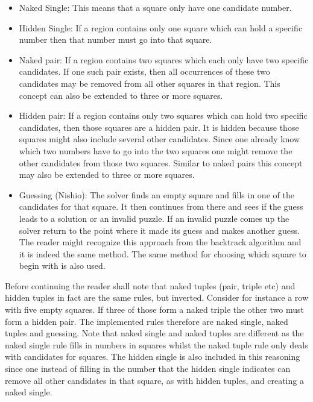 \documentclass[a4paper,11pt]{kth-mag}
\begin{document}
\begin{itemize}
    \item Naked Single: 
    This means that a square only have one candidate number.
    \item Hidden Single: 
    If a region contains only one square which can hold a specific number then that number must go into that square.
    \item Naked pair:
    If a region contains two squares which each only have two specific candidates.
If one such pair exists, then all occurrences of these two candidates may be removed from all other squares in that region.
This concept can also be extended to three or more squares.
    \item Hidden pair:
    If a region contains only two squares which can hold two specific candidates, then those squares are a hidden pair.
It is hidden because those squares might also include several other candidates.
Since one already know which two numbers have to go into the two squares one might remove the other candidates from those two squares.
Similar to naked pairs this concept may also be extended to three or more squares.

    \item Guessing (Nishio):
    The solver finds an empty square and fills in one of the candidates for that square.
    It then continues from there and sees if the guess leads to a solution or an invalid puzzle.
    If an invalid puzzle comes up the solver return to the point where it made its guess and makes another guess.
    The reader might recognize this approach from the backtrack algorithm and it is indeed the same method.
    The same method for choosing which square to begin with is also used.
\end{itemize}

Before continuing the reader shall note that naked tuples (pair, triple etc) and hidden tuples in fact are the same rules, but inverted.
Consider for instance a row with five empty squares.
If three of those form a naked triple the other two must form a hidden pair.
The implemented rules therefore are naked single, naked tuples and guessing.
Note that naked single and naked tuples are different as the naked single rule fills in numbers in squares whilst the naked tuple rule only deals with candidates for squares.
The hidden single is also included in this reasoning since one instead of filling in the number that the hidden single indicates can remove all other candidates in that square, as with hidden tuples, and creating a naked single.
\end{document}

